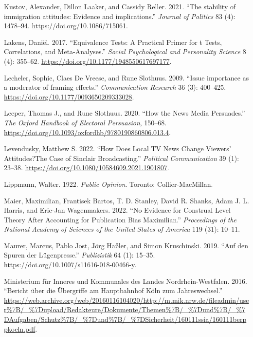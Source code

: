 \documentclass[
  12pt,
]{article}
\newlength{\cslhangindent}
\newlength{\cslentryspacingunit} %
\newenvironment{CSLReferences}[2] %
 {%
  \setlength{\parindent}{0pt}
  \ifodd #1
  \let\oldpar\par
  \def\par{\hangindent=\cslhangindent\oldpar}
  \fi
  \setlength{\parskip}{#2\cslentryspacingunit}
 }%
 {}
\begin{document}
\begin{CSLReferences}{1}{0}
\leavevmode{}%
Kustov, Alexander, Dillon Laaker, and Cassidy Reller. 2021. {``{The stability of immigration attitudes: Evidence and implications}.''} \emph{Journal of Politics} 83 (4): 1478--94. \url{https://doi.org/10.1086/715061}.

\leavevmode{}%
Lakens, Daniël. 2017. {``{Equivalence Tests: A Practical Primer for t Tests, Correlations, and Meta-Analyses}.''} \emph{Social Psychological and Personality Science} 8 (4): 355--62. \url{https://doi.org/10.1177/1948550617697177}.

\leavevmode{}%
Lecheler, Sophie, Claes De Vreese, and Rune Slothuus. 2009. {``{Issue importance as a moderator of framing effects}.''} \emph{Communication Research} 36 (3): 400--425. \url{https://doi.org/10.1177/0093650209333028}.

\leavevmode{}%
Leeper, Thomas J., and Rune Slothuus. 2020. {``{How the News Media Persuades}.''} \emph{The Oxford Handbook of Electoral Persuasion}, 150--68. \url{https://doi.org/10.1093/oxfordhb/9780190860806.013.4}.

\leavevmode{}%
Levendusky, Matthew S. 2022. {``{How Does Local TV News Change Viewers' Attitudes?The Case of Sinclair Broadcasting}.''} \emph{Political Communication} 39 (1): 23--38. \url{https://doi.org/10.1080/10584609.2021.1901807}.

\leavevmode{}%
Lippmann, Walter. 1922. \emph{{Public Opinion}}. Toronto: Collier-MacMillan.

\leavevmode{}%
Maier, Maximilian, Frantisek Bartos, T. D. Stanley, David R. Shanks, Adam J. L. Harris, and Eric-Jan Wagenmakers. 2022. {``{No Evidence for Construal Level Theory After Accounting for Publication Bias Maximilian}.''} \emph{Proceedings of the National Academy of Sciences of the United States of America} 119 (31): 10--11.

\leavevmode{}%
Maurer, Marcus, Pablo Jost, Jörg Haßler, and Simon Kruschinski. 2019. {``{Auf den Spuren der L{ü}genpresse}.''} \emph{Publizistik} 64 (1): 15--35. \url{https://doi.org/10.1007/s11616-018-00466-y}.

\leavevmode{}%
Ministerium für Inneres und Kommunales des Landes Nordrhein-Westfalen. 2016. {``{Bericht {ü}ber die {Ü}bergriffe am Hauptbahnhof K{ö}ln zum Jahreswechsel}.''} \url{https://web.archive.org/web/20160116104020/http://m.mik.nrw.de/fileadmin/user\%7B/_\%7Dupload/Redakteure/Dokumente/Themen\%7B/_\%7Dund\%7B/_\%7DAufgaben/Schutz\%7B/_\%7Dund\%7B/_\%7DSicherheit/160111ssia/160111berppkoeln.pdf}.


\end{CSLReferences}
\end{document}
